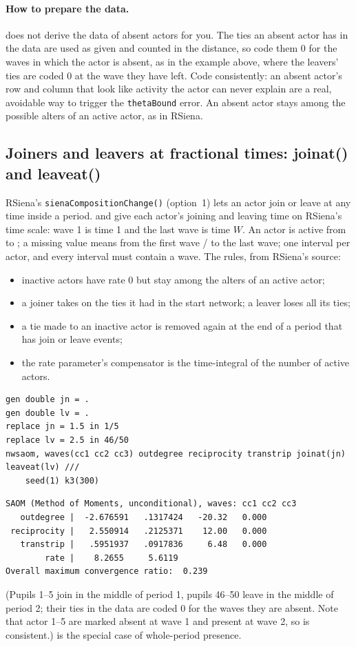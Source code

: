 \paragraph{How to prepare the data.} \nwsaom{} does not derive the data of absent actors for you. The ties an absent actor has in the data are used as given and counted in the distance, so code them 0 for the waves in which the actor is absent, as in the example above, where the leavers' ties are coded 0 at the wave they have left. Code consistently: an absent actor's row and column that look like activity the actor can never explain are a real, avoidable way to trigger the \texttt{thetaBound} error. An absent actor stays among the possible alters of an active actor, as in RSiena.

\subsection{Joiners and leavers at fractional times: joinat() and leaveat()}

RSiena's \texttt{sienaCompositionChange()} (option~1) lets an actor join or leave at any time inside a period.  and  give each actor's joining and leaving time on RSiena's time scale: wave 1 is time 1 and the last wave is time $W$. An actor is active from  to ; a missing value means from the first wave / to the last wave; one interval per actor, and every interval must contain a wave. The rules, from RSiena's source:
\begin{itemize}[nosep]
\item inactive actors have rate 0 but stay among the alters of an active actor;
\item a joiner takes on the ties it had in the start network; a leaver loses all its ties;
\item a tie made to an inactive actor is removed again at the end of a period that has join or leave events;
\item the rate parameter's compensator is the time-integral of the number of active actors.
\end{itemize}

\begin{lstlisting}
gen double jn = .
gen double lv = .
replace jn = 1.5 in 1/5
replace lv = 2.5 in 46/50
nwsaom, waves(cc1 cc2 cc3) outdegree reciprocity transtrip joinat(jn) leaveat(lv) ///
    seed(1) k3(300)
\end{lstlisting}
\begin{lstlisting}
SAOM (Method of Moments, unconditional), waves: cc1 cc2 cc3
   outdegree |  -2.676591   .1317424   -20.32   0.000
 reciprocity |   2.550914   .2125371    12.00   0.000
   transtrip |   .5951937   .0917836     6.48   0.000
        rate |    8.2655     5.6119
Overall maximum convergence ratio:  0.239
\end{lstlisting}
(Pupils 1--5 join in the middle of period 1, pupils 46--50 leave in the middle of period 2; their ties in the data are coded 0 for the waves they are absent. Note that actor 1--5 are marked absent at wave 1 and present at wave 2, so  is consistent.)  is the special case of whole-period presence.

